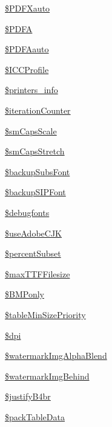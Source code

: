 \begin{DoxyCompactItemize}
\hyperlink{classm_p_d_f_abe9713f3c6bc0322fed493f2db9c7535}{\$\-P\-D\-F\-Xauto}
\item 
\hyperlink{classm_p_d_f_a063fffc945a7c98b9864bc450c3ea514}{\$\-P\-D\-F\-A}
\item 
\hyperlink{classm_p_d_f_aa1c216c47a477a722e477ebb6400ece2}{\$\-P\-D\-F\-Aauto}
\item 
\hyperlink{classm_p_d_f_acac3cd5b009e546a31f7055c7988654e}{\$\-I\-C\-C\-Profile}
\item 
\hyperlink{classm_p_d_f_a9b00a9248f59d95b616b800dc77b4868}{\$printers\-\_\-info}
\item 
\hyperlink{classm_p_d_f_a635dabb7289168c36c5ad10711492b49}{\$iteration\-Counter}
\item 
\hyperlink{classm_p_d_f_a1f83ea7af4a0395d54f57361ac1e7a3e}{\$sm\-Caps\-Scale}
\item 
\hyperlink{classm_p_d_f_a13d91fcbefaada82f83d02235fed183a}{\$sm\-Caps\-Stretch}
\item 
\hyperlink{classm_p_d_f_ae414cef3ea1d358071457c23ffa61da9}{\$backup\-Subs\-Font}
\item 
\hyperlink{classm_p_d_f_ab953573673e5ac9b13c12add4dfce942}{\$backup\-S\-I\-P\-Font}
\item 
\hyperlink{classm_p_d_f_ac55acdeb9ee7e6a7d74193fbd04365f2}{\$debugfonts}
\item 
\hyperlink{classm_p_d_f_aa5d4b32dd786a4fd1b7127ff2ca257a0}{\$use\-Adobe\-C\-J\-K}
\item 
\hyperlink{classm_p_d_f_adabe2a77b8b954582da29ceb5c64e826}{\$percent\-Subset}
\item 
\hyperlink{classm_p_d_f_a465cffc2d3c2dbbbdfed4b312afeb30d}{\$max\-T\-T\-F\-Filesize}
\item 
\hyperlink{classm_p_d_f_a2972b6074ba71c7c9f13e472378bfeb2}{\$\-B\-M\-Ponly}
\item 
\hyperlink{classm_p_d_f_a272025882c1c9dd546bb3e605b3bd69b}{\$table\-Min\-Size\-Priority}
\item 
\hyperlink{classm_p_d_f_a70e59e1b09972f04567c345b00a42342}{\$dpi}
\item 
\hyperlink{classm_p_d_f_a28e0b1a0f1a02caf3a9723471e2e76bf}{\$watermark\-Img\-Alpha\-Blend}
\item 
\hyperlink{classm_p_d_f_a531f8e206c4d77c4f78495cbc6f8c21a}{\$watermark\-Img\-Behind}
\item 
\hyperlink{classm_p_d_f_a528bb7927ac707bfdacd96b6a71ecca1}{\$justify\-B4br}
\item 
\hyperlink{classm_p_d_f_a4dfe7716d0f498ac516939b9abcf52ae}{\$pack\-Table\-Data}

\end{DoxyCompactItemize}
